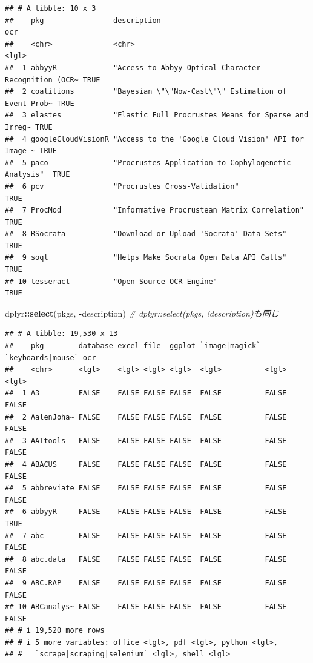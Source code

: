 \documentclass[
]{article}
\newenvironment{Shaded}{\begin{snugshade}}{\end{snugshade}}
\newcommand{\CommentTok}[1]{\textcolor[rgb]{0.56,0.35,0.01}{\textit{#1}}}
\newcommand{\FunctionTok}[1]{\textcolor[rgb]{0.13,0.29,0.53}{\textbf{#1}}}
\newcommand{\NormalTok}[1]{#1}
\newcommand{\SpecialCharTok}[1]{\textcolor[rgb]{0.81,0.36,0.00}{\textbf{#1}}}
\begin{document}
\begin{verbatim}
## # A tibble: 10 x 3
##    pkg                description                                          ocr  
##    <chr>              <chr>                                                <lgl>
##  1 abbyyR             "Access to Abbyy Optical Character Recognition (OCR~ TRUE 
##  2 coalitions         "Bayesian \"\"Now-Cast\"\" Estimation of Event Prob~ TRUE 
##  3 elastes            "Elastic Full Procrustes Means for Sparse and Irreg~ TRUE 
##  4 googleCloudVisionR "Access to the 'Google Cloud Vision' API for Image ~ TRUE 
##  5 paco               "Procrustes Application to Cophylogenetic Analysis"  TRUE 
##  6 pcv                "Procrustes Cross-Validation"                        TRUE 
##  7 ProcMod            "Informative Procrustean Matrix Correlation"         TRUE 
##  8 RSocrata           "Download or Upload 'Socrata' Data Sets"             TRUE 
##  9 soql               "Helps Make Socrata Open Data API Calls"             TRUE 
## 10 tesseract          "Open Source OCR Engine"                             TRUE
\end{verbatim}

\begin{Shaded}
\begin{Highlighting}[]
\NormalTok{dplyr}\SpecialCharTok{::}\FunctionTok{select}\NormalTok{(pkgs, }\SpecialCharTok{{-}}\NormalTok{description) }\CommentTok{\# dplyr::select(pkgs, !description)も同じ}
\end{Highlighting}
\end{Shaded}

\begin{verbatim}
## # A tibble: 19,530 x 13
##    pkg        database excel file  ggplot `image|magick` `keyboards|mouse` ocr  
##    <chr>      <lgl>    <lgl> <lgl> <lgl>  <lgl>          <lgl>             <lgl>
##  1 A3         FALSE    FALSE FALSE FALSE  FALSE          FALSE             FALSE
##  2 AalenJoha~ FALSE    FALSE FALSE FALSE  FALSE          FALSE             FALSE
##  3 AATtools   FALSE    FALSE FALSE FALSE  FALSE          FALSE             FALSE
##  4 ABACUS     FALSE    FALSE FALSE FALSE  FALSE          FALSE             FALSE
##  5 abbreviate FALSE    FALSE FALSE FALSE  FALSE          FALSE             FALSE
##  6 abbyyR     FALSE    FALSE FALSE FALSE  FALSE          FALSE             TRUE 
##  7 abc        FALSE    FALSE FALSE FALSE  FALSE          FALSE             FALSE
##  8 abc.data   FALSE    FALSE FALSE FALSE  FALSE          FALSE             FALSE
##  9 ABC.RAP    FALSE    FALSE FALSE FALSE  FALSE          FALSE             FALSE
## 10 ABCanalys~ FALSE    FALSE FALSE FALSE  FALSE          FALSE             FALSE
## # i 19,520 more rows
## # i 5 more variables: office <lgl>, pdf <lgl>, python <lgl>,
## #   `scrape|scraping|selenium` <lgl>, shell <lgl>
\end{verbatim}
\end{document}
